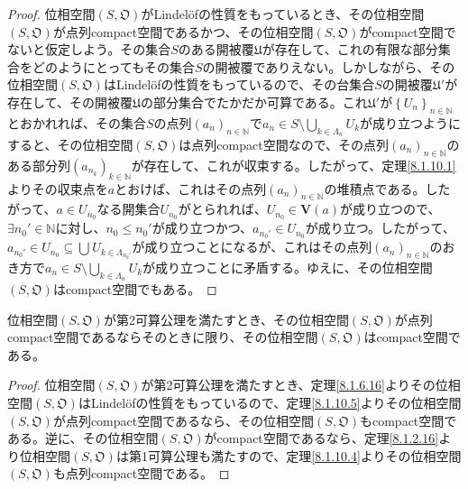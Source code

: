 \documentclass[dvipdfmx]{jsarticle}
\begin{document}
\begin{proof}
位相空間$\left( S,\mathfrak{O} \right)$がLindelöfの性質をもっているとき、その位相空間$\left( S,\mathfrak{O} \right)$が点列compact空間であるかつ、その位相空間$\left( S,\mathfrak{O} \right)$がcompact空間でないと仮定しよう。その集合$S$のある開被覆$\mathfrak{U}$が存在して、これの有限な部分集合をどのようにとってもその集合$S$の開被覆でありえない。しかしながら、その位相空間$\left( S,\mathfrak{O} \right)$はLindelöfの性質をもっているので、その台集合$S$の開被覆$\mathfrak{U}'$が存在して、その開被覆$\mathfrak{U}$の部分集合でたかだか可算である。これ$\mathfrak{U}'$が$\left\{ U_{n} \right\}_{n \in \mathbb{N}}$とおかれれば、その集合$S$の点列$\left( a_{n} \right)_{n \in \mathbb{N}}$で$a_{n} \in S \setminus \bigcup_{k \in \varLambda_{n}} U_{k}$が成り立つようにすると、その位相空間$\left( S,\mathfrak{O} \right)$は点列compact空間なので、その点列$\left( a_{n} \right)_{n \in \mathbb{N}}$のある部分列$\left( a_{n_{k}} \right)_{k \in \mathbb{N}}$が存在して、これが収束する。したがって、定理\ref{8.1.10.1}よりその収束点を$a$とおけば、これはその点列$\left( a_{n} \right)_{n \in \mathbb{N}}$の堆積点である。したがって、$a \in U_{n_{0}}$なる開集合$U_{n_{0}}$がとられれば、$U_{n_{0}} \in \mathbf{V}(a)$が成り立つので、$\exists n_{0}' \in \mathbb{N}$に対し、$n_{0} \leq n_{0}'$が成り立つかつ、$a_{n_{0}'} \in U_{n_{0}}$が成り立つ。したがって、$a_{n_{0}'} \in U_{n_{0}} \subseteq \bigcup_{} U_{k \in \varLambda_{n_{0}'}}$が成り立つことになるが、これはその点列$\left( a_{n} \right)_{n \in \mathbb{N}}$のおき方で$a_{n} \in S \setminus \bigcup_{k \in \varLambda_{n}} U_{k}$が成り立つことに矛盾する。ゆえに、その位相空間$\left( S,\mathfrak{O} \right)$はcompact空間でもある。
\end{proof}
\begin{thm}\label{8.1.10.5s}
位相空間$\left( S,\mathfrak{O} \right)$が第2可算公理を満たすとき、その位相空間$\left( S,\mathfrak{O} \right)$が点列compact空間であるならそのときに限り、その位相空間$\left( S,\mathfrak{O} \right)$はcompact空間である。
\end{thm}
\begin{proof}
位相空間$\left( S,\mathfrak{O} \right)$が第2可算公理を満たすとき、定理\ref{8.1.6.16}よりその位相空間$\left( S,\mathfrak{O} \right)$はLindelöfの性質をもっているので、定理\ref{8.1.10.5}よりその位相空間$\left( S,\mathfrak{O} \right)$が点列compact空間であるなら、その位相空間$\left( S,\mathfrak{O} \right)$もcompact空間である。逆に、その位相空間$\left( S,\mathfrak{O} \right)$がcompact空間であるなら、定理\ref{8.1.2.16}より位相空間$\left( S,\mathfrak{O} \right)$は第1可算公理も満たすので、定理\ref{8.1.10.4}よりその位相空間$\left( S,\mathfrak{O} \right)$も点列compact空間である。
\end{proof}
\end{document}
